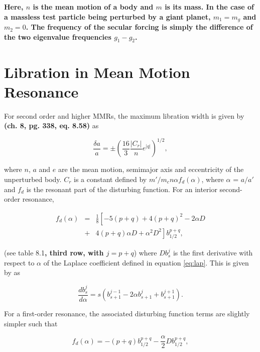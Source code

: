 \documentclass[fleqn,usenatbib]{mnras}
\begin{document}
\noindent \textbf{Here, $n$ is the mean motion of a body and $m$ is its mass. In the case of a massless test particle being perturbed by a giant planet, $m_{1} = m_{g}$ and $m_{2} = 0$. 
The frequency of the secular forcing is simply the difference of the two eigenvalue frequencies $g_{1} - g_{2}$.}

\section{Libration in Mean Motion Resonance}\label{sec:libration}

For second order and higher MMRs, the maximum libration width is given by \citet{1999ssd..book.....M} \textbf{(ch. 8, pg. 338, eq. 8.58)} as

\begin{equation}\label{eq:res_so}
	\frac{\delta a}{a} = \pm \left( \frac{16}{3} \frac{\left| C_{r} \right|}{n} e^{\left| q \right|} \right)^{1/2},
\end{equation}

\noindent where $n$, $a$ and $e$ are the mean motion, semimajor axis and eccentricity of the unperturbed body. $C_{r}$ is a constant defined by 
$m'/m_{c} n \alpha f_{d}(\alpha)$, where $\alpha$ = $a/a'$ and $f_{d}$ is the resonant part of the disturbing function. For an interior second-order 
resonance,

\begin{eqnarray}\label{eq:fd_so}
	f_{d} (\alpha) &=& \frac{1}{8} \left[ -5(p+q) + 4(p+q)^{2} - 2 \alpha D \right. \\ \nonumber
	                      & + & \left. 4(p+q) \alpha D + \alpha^{2} D^{2} \right] b^{p+q}_{1/2},
\end{eqnarray}

\noindent (see \citet{1999ssd..book.....M} table 8.1\textbf{, third row, with $j = p + q$}) where $D b^{j}_{s}$ is the first derivative with respect to $\alpha$ of the Laplace coefficient defined in 
equation \ref{eq:lap}. This is given by \citet{1961mcm..book.....B} as

\begin{equation}\label{eq:lap_d}
	\frac{d b_{s}^{j}}{d \alpha} = s \left( b_{s+1}^{j-1} - 2 \alpha b_{s+1}^{j} + b_{s+1}^{j+1} \right).
\end{equation}

For a first-order resonance, the associated disturbing function terms are slightly simpler such that

\begin{equation}\label{eq:fd_fo}
	f_{d}(\alpha) = -(p+q) b_{1/2}^{p+q} - \frac{\alpha}{2} D b_{1/2}^{p+q},
\end{equation}
\end{document}
